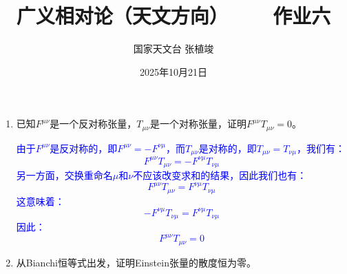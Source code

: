 \documentclass[a4paper]{article}
\title{\textbf{广义相对论（天文方向）\ \ \ \ 作业六}}
\author{国家天文台 张植竣}
\date{2025年10月21日}
\begin{document}
\maketitle

\begin{enumerate}
    \item 已知$F^{\mu\nu}$是一个反对称张量，$T_{\mu\nu}$是一个对称张量，证明$F^{\mu\nu}T_{\mu\nu}=0$。

    \textcolor{blue}{
    由于$F^{\mu\nu}$是反对称的，即$F^{\mu\nu} = -F^{\nu\mu}$，而$T_{\mu\nu}$是对称的，即$T_{\mu\nu} = T_{\nu\mu}$，我们有：
    \[
    F^{\mu\nu}T_{\mu\nu} = -F^{\nu\mu}T_{\nu\mu}
    \]
    另一方面，交换重命名$\mu$和$\nu$不应该改变求和的结果，因此我们也有：
    \[
    F^{\mu\nu}T_{\mu\nu} = F^{\nu\mu}T_{\nu\mu}
    \]
    这意味着：
    \[
    -F^{\nu\mu}T_{\nu\mu} = F^{\nu\mu}T_{\nu\mu}
    \]
    因此：
    \[
        F^{\mu\nu}T_{\mu\nu} = 0
    \]
    }

    \item 从Bianchi恒等式出发，证明Einstein张量的散度恒为零。


\end{enumerate}
\end{document}
